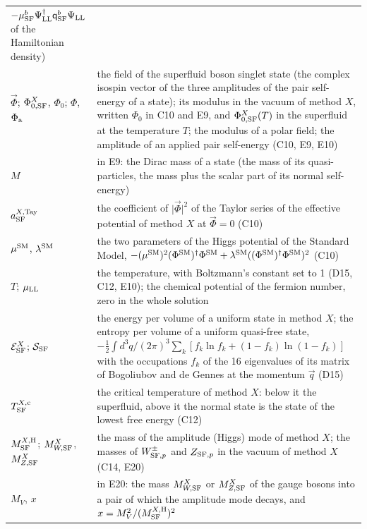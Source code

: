 \documentclass[
  10pt,
]{article}
\begin{document}
\begin{longtable}[]{@{}
  >{\raggedright\arraybackslash}p{}
  >{\raggedright\arraybackslash}p{}@{}}
\(-\mu^b_{\rm SF}\Psi^\dagger_{\rm LL}\mathsf q^b_{\rm SF}\Psi_{\rm LL}\)
of the Hamiltonian density) \\
\(\vec\Phi\); \(\Phi^X_{0,{\rm SF}}\), \(\Phi_0\); \(\Phi\),
\(\Phi_{\rm a}\) & the field of the superfluid boson singlet state (the
complex isospin vector of the three amplitudes of the pair self-energy
of a state); its modulus in the vacuum of method \(X\), written
\(\Phi_0\) in C10 and E9, and \(\Phi^X_{0,{\rm SF}}(T)\) in the
superfluid at the temperature \(T\); the modulus of a polar field; the
amplitude of an applied pair self-energy (C10, E9, E10) \\
\(M\) & in E9: the Dirac mass of a state (the mass of its
quasi-particles, the mass plus the scalar part of its normal
self-energy) \\
\(a^{X,{\rm Tay}}_{\rm SF}\) & the coefficient of
\(\lvert\vec\Phi\rvert^2\) of the Taylor series of the effective
potential of method \(X\) at \(\vec\Phi=0\) (C10) \\
\(\mu^{\rm SM}\), \(\lambda^{\rm SM}\) & the two parameters of the Higgs
potential of the Standard Model,
\(-(\mu^{\rm SM})^2(\Phi^{\rm SM})^\dagger\Phi^{\rm SM}+\lambda^{\rm SM}((\Phi^{\rm SM})^\dagger\Phi^{\rm SM})^2\)
(C10) \\
\(T\); \(\mu_{\rm LL}\) & the temperature, with Boltzmann's constant set
to 1 (D15, C12, E10); the chemical potential of the fermion number, zero
in the whole solution \\
\(\mathcal E^X_{\rm SF}\); \(\mathcal S_{\rm SF}\) & the energy per
volume of a uniform state in method \(X\); the entropy per volume of a
uniform quasi-free state,
\(-\tfrac12\int d^3q/(2\pi)^3\sum_k[f_k\ln f_k+(1-f_k)\ln(1-f_k)]\) with
the occupations \(f_k\) of the 16 eigenvalues of its matrix of
Bogoliubov and de Gennes at the momentum \(\vec q\) (D15) \\
\(T^{X,{\rm c}}_{\rm SF}\) & the critical temperature of method \(X\):
below it the superfluid, above it the normal state is the state of the
lowest free energy (C12) \\
\(M^{X,{\rm H}}_{\rm SF}\); \(M^X_{W,{\rm SF}}\), \(M^X_{Z,{\rm SF}}\) &
the mass of the amplitude (Higgs) mode of method \(X\); the masses of
\(W^\pm_{{\rm SF},p}\) and \(Z_{{\rm SF},p}\) in the vacuum of method
\(X\) (C14, E20) \\
\(M_V\), \(x\) & in E20: the mass \(M^X_{W,{\rm SF}}\) or
\(M^X_{Z,{\rm SF}}\) of the gauge bosons into a pair of which the
amplitude mode decays, and \(x=M_V^2/(M^{X,{\rm H}}_{\rm SF})^2\) \\

\end{longtable}
\end{document}
